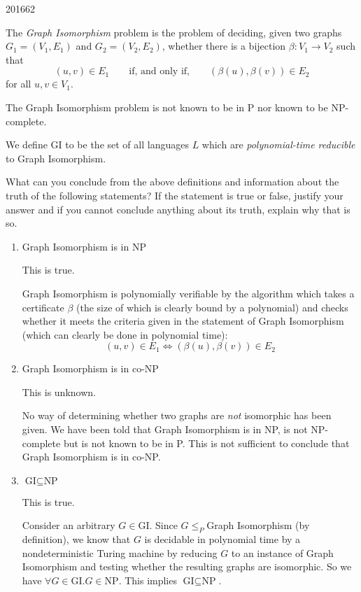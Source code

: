 \documentclass[10pt,\jkfside,a4paper]{article}
\begin{document}
\begin{examquestion}{2016}{6}{2}

The \textit{Graph Isomorphism} problem is the problem of deciding, given two
graphs $G_1 = (V_1, E_1)$ and $G_2 = (V_2, E_2)$, whether there is a
bijection $\beta: V_1 \to V_2$ such that
\[
(u, v) \in E_1 \qquad \text{if, and only if,} \qquad (\beta(u), \beta(v)) \in E_2
\]
for all $u, v \in V_1$.

The Graph Isomorphism problem is not known to be in P nor known to
be NP-complete.

We define GI to be the set of all languages $L$ which are
\textit{polynomial-time reducible} to Graph Isomorphism.

What can you conclude from the above definitions and information about the
truth of the following statements? If the statement is true or false,
justify your answer and if you cannot conclude anything about its truth,
explain why that is so.

\begin{enumerate}

\item Graph Isomorphism is in NP

This is true.

Graph Isomorphism is polynomially verifiable by the algorithm which takes a
certificate $\beta$ (the size of which is clearly bound by a polynomial) and
checks whether it meets the criteria given in the statement of Graph
Isomorphism (which can clearly be done in polynomial time):
\[
(u, v) \in E_1 \iff (\beta(u), \beta(v)) \in E_2
\]

\item Graph Isomorphism is in co-NP

This is unknown.

No way of determining whether two graphs are \textit{not} isomorphic has
been given. We have been told that Graph Isomorphism is in NP, is not
NP-complete but is not known to be in P. This is not sufficient to conclude
that Graph Isomorphism is in co-NP\@.

\item $\text{GI} \subseteq \text{NP}$

This is true.

Consider an arbitrary $G \in \text{GI}$. Since $G \le_P $Graph Isomorphism
(by definition), we know that $G$ is decidable in polynomial time by a
nondeterministic Turing machine by reducing $G$ to an instance of Graph
Isomorphism and testing whether the resulting graphs are isomorphic. So we
have $\forall G \in \text{GI}. G \in \text{NP}$. This implies
$\text{GI} \subseteq \text{NP}$.


\end{enumerate}
\end{examquestion}
\end{document}
